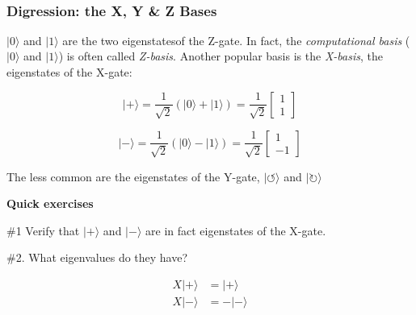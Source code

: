\documentclass[11pt]{article}
\makeatletter
\newcommand{\boxspacing}{\kern\kvtcb@left@rule\kern\kvtcb@boxsep}
\newcommand{\prompt}[4]{
        {\ttfamily\llap{{\color{#2}[#3]:\hspace{3pt}#4}}\vspace{-\baselineskip}}
    }
\makeatother
\begin{document}
            
\prompt{Out}{outcolor}{51}{}
    
    \begin{center}
    \end{center}
    { \hspace*{\fill} \\}
    

    \begin{tcolorbox}[breakable, size=fbox, boxrule=1pt, pad at break*=1mm,colback=cellbackground, colframe=cellborder]
\prompt{In}{incolor}{ }{\boxspacing}
\begin{Verbatim}[commandchars=\\\{\}]

\end{Verbatim}
\end{tcolorbox}

    \hypertarget{digression-the-x-y-z-bases}{%
\subsubsection{Digression: the X, Y \& Z
Bases}\label{digression-the-x-y-z-bases}}

    \(|0\rangle\) and \(|1\rangle\) are the two eigenstatesof the Z-gate. In
fact, the \emph{computational basis} (\(|0\rangle\) and \(|1\rangle\))
is often called \emph{Z-basis}. Another popular basis is the
\emph{X-basis}, the eigenstates of the X-gate:

\[
|+\rangle 
= \frac{1}{\sqrt{2}}(|0\rangle + |1\rangle) 
= \frac{1}{\sqrt{2}}
\begin{bmatrix}
1\\
1
\end{bmatrix}
\]

\[
|-\rangle 
= \frac{1}{\sqrt{2}}(|0\rangle - |1\rangle) 
= \frac{1}{\sqrt{2}}
\begin{bmatrix}
1\\
-1
\end{bmatrix}
\]

    The less common are the eigenstates of the Y-gate,
\(|\circlearrowleft \rangle\) and \(| \circlearrowright \rangle\)

    \textbf{Quick exercises}

\#1 Verify that \(|+\rangle\) and \(|-\rangle\) are in fact eigenstates
of the X-gate.

\#2. What eigenvalues do they have?

\[
\begin{eqnarray}
X |+\rangle &= |+\rangle \\
X |-\rangle &= -|-\rangle
\end{eqnarray}
\]
\end{document}
